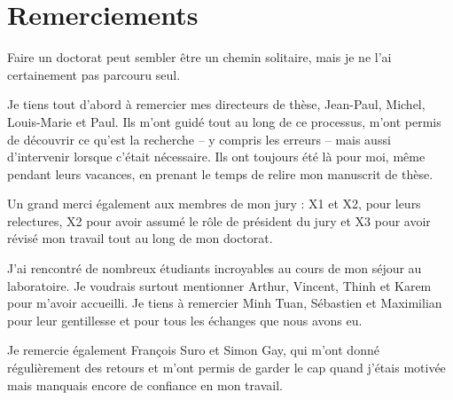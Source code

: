 



\bigskip

\begingroup
\let\clearpage\relax
\let\cleardoublepage\relax
\let\cleardoublepage\relax
\chapter*{Remerciements}

Faire un doctorat peut sembler être un chemin solitaire, mais je ne l'ai certainement pas parcouru seul.

Je tiens tout d'abord à remercier mes directeurs de thèse, Jean-Paul, Michel, Louis-Marie et Paul. Ils m'ont guidé tout au long de ce processus, m'ont permis de découvrir ce qu'est la recherche – y compris les erreurs – mais aussi d'intervenir lorsque c'était nécessaire. Ils ont toujours été là pour moi, même pendant leurs vacances, en prenant le temps de relire mon manuscrit de thèse.

Un grand merci également aux membres de mon jury : X1 et X2, pour leurs relectures, X2 pour avoir assumé le rôle de président du jury et X3 pour avoir révisé mon travail tout au long de mon doctorat.

J'ai rencontré de nombreux étudiants incroyables au cours de mon séjour au laboratoire. Je voudrais surtout mentionner Arthur, Vincent, Thinh et Karem pour m'avoir accueilli. Je tiens à remercier Minh Tuan, Sébastien et Maximilian pour leur gentillesse et pour tous les échanges que nous avons eu.

Je remercie également François Suro et Simon Gay, qui m'ont donné régulièrement des retours et m'ont permis de garder le cap quand j'étais motivée mais manquais encore de confiance en mon travail.

